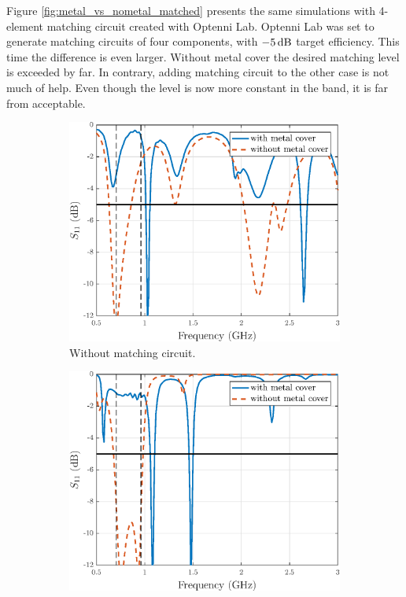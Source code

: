 Figure \ref{fig:metal_vs_nometal_matched} presents the same simulations with 4-element matching circuit created with Optenni Lab. Optenni Lab was set to generate matching circuits of four components, with $-5\,\mathrm{dB}$ target efficiency. This time the difference is even larger. Without metal cover the desired matching level is exceeded by far. In contrary, adding matching circuit to the other case is not much of help. Even though the level is now more constant in the band, it is far from acceptable.

\begin{figure}[H]
    \centering 
    \begin{subfigure}[b]{0.49\textwidth}
        \includegraphics[width=\textwidth]{img/metal_vs_nometal.eps}
        \caption{Without matching circuit.}
        \label{fig:metal_vs_nometal}
    \end{subfigure}
    \begin{subfigure}[b]{0.49\textwidth}
        \includegraphics[width=\textwidth]{img/metal_vs_nometal_matched.eps}

\end{subfigure}
\end{figure}

